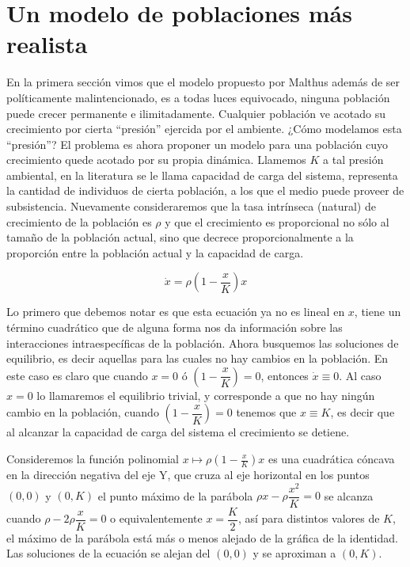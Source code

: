 \section{Un modelo de poblaciones más realista}

En la primera sección vimos que el modelo propuesto por Malthus  además de ser políticamente malintencionado, es a todas luces equivocado, ninguna población puede crecer permanente e ilimitadamente. Cualquier población ve acotado su crecimiento por cierta ``presión'' ejercida por el ambiente. ¿Cómo modelamos esta ``presión''? El problema es ahora proponer un modelo para una población cuyo crecimiento quede acotado por su propia dinámica. Llamemos $K$ a tal presión ambiental, en la literatura se le llama capacidad de carga del sistema, representa la cantidad de individuos de cierta población, a los que el medio puede proveer de subsistencia. Nuevamente consideraremos que la tasa intrínseca (natural) de crecimiento de la población es $\rho$ y que el crecimiento es proporcional no sólo al tamaño de la población actual, sino que decrece proporcionalmente a la proporción entre la población actual y la capacidad de carga.

\begin{equation}
    \dot{x}=\rho(1-\frac{x}{K})x
\end{equation}

Lo primero que debemos notar es que esta ecuación ya no es lineal en $x$, tiene un término cuadrático que de alguna forma nos da información sobre las interacciones intraespecíficas de la población. Ahora busquemos las soluciones de equilibrio, es decir aquellas para las cuales no hay cambios en la población. En este caso es claro que cuando $x=0$ ó $\left(1-\dfrac{x}{K}\right)=0$, entonces $\dot{x}\equiv 0$. Al caso  $x=0$ lo llamaremos el equilibrio trivial, y corresponde a que no hay ningún cambio en la población, cuando   $\left(1-\dfrac{x}{K}\right)=0$ tenemos que $x\equiv K$, es decir que al alcanzar la capacidad de carga del sistema el crecimiento se detiene. 

Consideremos la función polinomial $x\mapsto \rho(1-\frac{x}{K})x$ es una cuadrática cóncava en la dirección negativa del eje $\mathrm{Y}$, que cruza al eje horizontal en los puntos $(0,0)$ y $(0,K)$ el punto máximo de la parábola $\rho x-\rho \dfrac{x^2}{K}=0$ se alcanza cuando $\rho-2\rho \dfrac{x}{K}=0$ o equivalentemente $x=\dfrac{K}{2}$, así para distintos valores de $K$, el máximo de la parábola está más o menos alejado de la gráfica de la identidad. Las soluciones de la ecuación se alejan del $(0,0)$ y se aproximan a $(0,K)$. 

